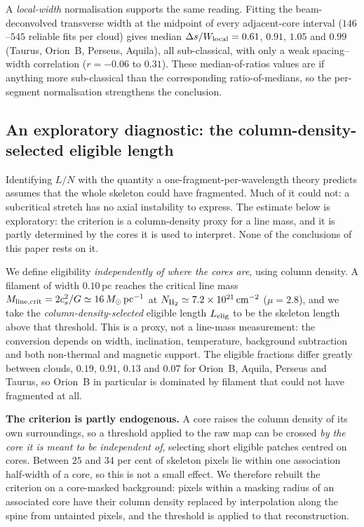 \documentclass[usenatbib,twoside,twocolumn]{mnras}
\begin{document}
A \emph{local-width} normalisation supports the same reading. Fitting the beam-deconvolved transverse width at the midpoint of every adjacent-core interval ($146$--$545$ reliable fits per cloud) gives median $\Delta s/W_{\rm local}=0.61$, $0.91$, $1.05$ and $0.99$ (Taurus, Orion~B, Perseus, Aquila), all sub-classical, with only a weak spacing--width correlation ($r=-0.06$ to $0.31$). These median-of-ratios values are if anything more sub-classical than the corresponding ratio-of-medians, so the per-segment normalisation strengthens the conclusion.



\subsection{An exploratory diagnostic: the column-density-selected eligible length}
\label{sec:eligible}

Identifying $L/N$ with the quantity a one-fragment-per-wavelength theory predicts assumes that the whole skeleton could have fragmented. Much of it could not: a subcritical stretch has no axial instability to express. The estimate below is exploratory: the criterion is a column-density proxy for a line mass, and it is partly determined by the cores it is used to interpret. None of the conclusions of this paper rests on it.

We define eligibility \emph{independently of where the cores are}, using column density. A filament of width $0.10$\,pc reaches the critical line mass $M_{\rm line,crit}=2c_s^2/G\simeq16\,M_\odot\,{\rm pc^{-1}}$ at $N_{\rm H_2}\simeq7.2\times10^{21}\,{\rm cm^{-2}}$ ($\mu=2.8$), and we take the \emph{column-density-selected} eligible length $L_{\rm elig}$ to be the skeleton length above that threshold. This is a proxy, not a line-mass measurement: the conversion depends on width, inclination, temperature, background subtraction and both non-thermal and magnetic support. The eligible fractions differ greatly between clouds, $0.19$, $0.91$, $0.13$ and $0.07$ for Orion~B, Aquila, Perseus and Taurus, so Orion~B in particular is dominated by filament that could not have fragmented at all.

\smallskip\noindent\textbf{The criterion is partly endogenous.} A core raises the column density of its own surroundings, so a threshold applied to the raw map can be crossed \emph{by the core it is meant to be independent of}, selecting short eligible patches centred on cores. Between $25$ and $34$ per cent of skeleton pixels lie within one association half-width of a core, so this is not a small effect. We therefore rebuilt the criterion on a core-masked background: pixels within a masking radius of an associated core have their column density replaced by interpolation along the spine from untainted pixels, and the threshold is applied to that reconstruction.
\end{document}
